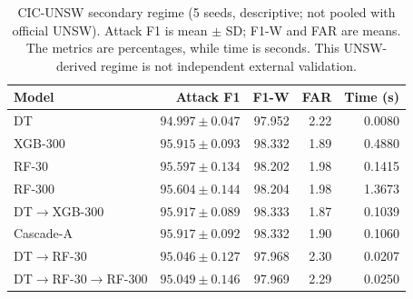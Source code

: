 \begin{table}[!htbp]
\centering
\caption{CIC-UNSW secondary regime (5 seeds, descriptive; not pooled with official UNSW). Attack F1 is mean $\pm$ SD; F1-W and FAR are means. The metrics are percentages, while time is seconds. This UNSW-derived regime is not independent external validation.}
\label{tab:cic}
\small
\setlength{\tabcolsep}{4pt}
\begin{tabularx}{\textwidth}{@{}Xrrrr@{}}
\toprule
Model & Attack F1 & F1-W & FAR & Time (s) \\
\midrule
DT & $94.997\pm0.047$ & 97.952 & 2.22 & 0.0080 \\
XGB-300 & $95.915\pm0.093$ & 98.332 & 1.89 & 0.4880 \\
RF-30 & $95.597\pm0.134$ & 98.202 & 1.98 & 0.1415 \\
RF-300 & $95.604\pm0.144$ & 98.204 & 1.98 & 1.3673 \\
DT$\to$XGB-300 & $95.917\pm0.089$ & 98.333 & 1.87 & 0.1039 \\
Cascade-A & $95.917\pm0.092$ & 98.332 & 1.90 & 0.1060 \\
DT$\to$RF-30 & $95.046\pm0.127$ & 97.968 & 2.30 & 0.0207 \\
DT$\to$RF-30$\to$RF-300 & $95.049\pm0.146$ & 97.969 & 2.29 & 0.0250 \\
\bottomrule
\end{tabularx}
\end{table}
